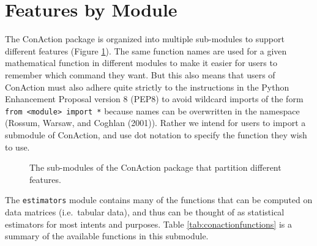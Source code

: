 \documentclass[
  letterpaper,
  DIV=11,
  numbers=noendperiod]{scrreprt}
\begin{document}
\section{Features by Module}\label{features-by-module}

The ConAction package is organized into multiple sub-modules to support
different features (Figure \ref{fig:conactionmodules}). The same
function names are used for a given mathematical function in different
modules to make it easier for users to remember which command they want.
But this also means that users of ConAction must also adhere quite
strictly to the instructions in the Python Enhancement Proposal version
8 (PEP8) to avoid wildcard imports of the form
\texttt{from\ \textless{}module\textgreater{}\ import\ *} because names
can be overwritten in the namespace (Rossum, Warsaw, and Coghlan
(2001)). Rather we intend for users to import a submodule of ConAction,
and use dot notation to specify the function they wish to use.

\begin{figure}[H]
    \centering
  \caption{The sub-modules of the ConAction package that partition different features.}
  \label{fig:conactionmodules}
\end{figure}

The \texttt{estimators} module contains many of the functions that can
be computed on data matrices (i.e.~tabular data), and thus can be
thought of as statistical estimators for most intents and purposes.
Table \ref{tab:conactionfunctions} is a summary of the available
functions in this submodule.
\end{document}

